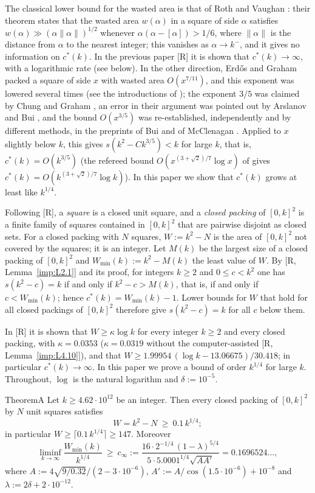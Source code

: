 \documentclass[11pt]{amsart}
\theoremstyle{definition}
\theoremstyle{remark}
\numberwithin{equation}{section}
\begin{document}
The classical lower bound for the wasted area is that of Roth and Vaughan \cite{RV}: their theorem
\cite[p.~170, Theorem]{RV} states that the wasted area $w(\alpha)$ in a square of side $\alpha$ satisfies
$w(\alpha)\gg(\alpha\|\alpha\|)^{1/2}$ whenever $\alpha(\alpha-[\alpha])>1/6$, where $\|\alpha\|$ is the distance from
$\alpha$ to the nearest integer; this vanishes as $\alpha\to k^-$, and it gives no information on $c^*(k)$. In the
previous paper [R] it is shown that $c^*(k)\to\infty$, with a logarithmic rate (see below). In the other direction,
Erd\H{o}s and Graham \cite{EG} packed a square of side $x$ with wasted area $O(x^{7/11})$, and this exponent was lowered
several times (see the introductions of \cite{McC,Bui}); the exponent $3/5$ was claimed by Chung and Graham \cite{CG}, an
error in their argument was pointed out by Arslanov and Bui \cite{AB}, and the bound $O(x^{3/5})$ was re-established,
independently and by different methods, in the preprints of Bui \cite{Bui} and of McClenagan \cite{McC}. Applied to $x$
slightly below $k$, this gives $s(k^2-Ck^{3/5})<k$ for large $k$, that is, $c^*(k)=O(k^{3/5})$ (the refereed bound
$O(x^{(3+\sqrt2)/7}\log x)$ of \cite{CG09} gives $c^*(k)=O(k^{(3+\sqrt2)/7}\log k)$). In this paper we show that $c^*(k)$
grows at least like $k^{1/4}$.

Following [R], a \emph{square} is a closed unit square, and a
\emph{closed packing} of $[0,k]^2$ is a finite family of squares contained in $[0,k]^2$ that are pairwise disjoint as
closed sets. For a closed packing with $N$ squares, $W:=k^2-N$ is the area of $[0,k]^2$ not covered by the squares; it
is an integer. Let $M(k)$ be the largest size of a closed packing of $[0,k]^2$ and $W_{\min}(k):=k^2-M(k)$ the least
value of $W$.
By [R, Lemma~\ref{imp:L2.1}] and its proof, for integers $k\ge2$ and $0\le c<k^2$ one has $s(k^2-c)=k$ if and only if
$k^2-c>M(k)$, that is, if and only if $c<W_{\min}(k)$; hence $c^*(k)=W_{\min}(k)-1$. Lower bounds for $W$ that hold for
all closed packings of $[0,k]^2$ therefore give $s(k^2-c)=k$ for all $c$ below them.

In [R] it is shown that $W\ge\kappa\log k$ for every integer $k\ge2$ and every closed packing, with $\kappa=0.0353$
($\kappa=0.0319$ without the computer-assisted [R, Lemma~\ref{imp:L4.10}]), and that $W\ge1.99954\,(\log k-13.06675)/30.418$;
in particular $c^*(k)\to\infty$. In this paper we prove a bound of order $k^{1/4}$ for large $k$. Throughout, $\log$ is
the natural logarithm and $\delta:=10^{-5}$.

\begin{IntroStatement}{Theorem}{A}\label{thm:A}
Let $k\ge4.62\cdot10^{12}$ be an integer. Then every closed packing of $[0,k]^2$ by $N$ unit squares satisfies
\[
W=k^2-N\ \ge\ 0.1\,k^{1/4};
\]
in particular $W\ge\lceil0.1\,k^{1/4}\rceil\ge147$. Moreover
\[
\liminf_{k\to\infty}\frac{W_{\min}(k)}{k^{1/4}}\ \ge\ c_\infty:=\frac{16\cdot2^{-1/4}\,(1-\lambda)^{5/4}}{5\cdot5.0001^{1/4}\sqrt{AA'}}
=0.1696524\ldots,
\]
where $A:=4\sqrt{9/0.32}/(2-3\cdot10^{-6})$, $A':=A/\cos(1.5\cdot10^{-6})+10^{-8}$ and $\lambda:=2\delta+2\cdot10^{-12}$.
\end{IntroStatement}
\end{document}
